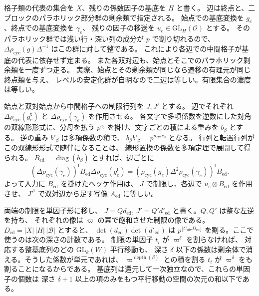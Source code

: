 格子類の代表の集合を \(X\)、残りの係数因子の基底を \(H\) と書く。
辺は終点と、二ブロックのパラホリック部分群の剰余類で指定される。
始点での基底変換を \(g_e\)、終点での基底変換を \(\gamma_e\)、
残りの因子の移送を \(u_e\in\mathrm{GL}_H(\mathcal O)\) とする。
そのパラホリック群では浅い行・深い列の成分が \(p\) で割り切れるので、
\(\Delta\rho_\mathrm{cyc}(g)\Delta^{-1}\) はこの群に対して整である。
これにより各辺での中間格子が基底の代表に依存せず定まる。
また各双対辺も、始点とそこでのパラホリック剰余類を一度ずつ走る。
実際、始点とその剰余類が同じなら遷移の有理元が同じ終点類を与え、
レベルの安定化群が自明なので二辺は等しい。有限集合の濃度は等しい。

始点と双対始点から中間格子への制限行列を \(J,J'\) とする。
辺でそれぞれ \(\Delta\rho_\mathrm{cyc}(g_e^{\mathsf t})\) と
\(\Delta\rho_\mathrm{cyc}(\gamma_e)\) を作用させる。
各文字で多項係数を逆数にした対角の双線形形式に、分母を払う
\(p^{c_0}\) を掛け、文字ごとの積による重みを \(b_\beta\) とする。
逆の重み \(b'_\beta\) は多項係数の積で、
\(b_\beta b'_\beta=p^{n_\mathrm{cyc}c_0}\) となる。
行列と転置行列がこの双線形形式で随伴になることは、
線形置換の係数を多項定理で展開して得られる。
\(B_\mathrm{ed}=\operatorname{diag}(b_\beta)\) とすれば、辺ごとに
\[
 (\Delta\rho_\mathrm{cyc}(\gamma_e))^{\mathsf t}B_\mathrm{ed}
       \Delta\rho_\mathrm{cyc}(g_e^{\mathsf t})
   =(\rho_\mathrm{cyc}(g_e)\Delta^2\rho_\mathrm{cyc}(\gamma_e))^{\mathsf t}B_\mathrm{ed}.
\]
よって入力に \(B_\mathrm{ed}\) を掛けたヘッケ作用は、
\(J\) で制限し、各辺で \(u_e\otimes B_\mathrm{ed}\) を作用させ、
\(J'^{\mathsf t}\) で双対辺から足す写像 \(A_\mathrm{ed}\) に等しい。

両端の制限を単因子形に移し、
\(J=Qd_\mathrm{ed}\), \(J'=Q'd'_\mathrm{ed}\) と書く。\(Q,Q'\) は整な左逆を持ち、
それぞれの像は \(\varpi\) の冪で飽和させた制限の像である。
\(D_\mathrm{ed}=|X|\,|H|\,|\mathcal B|\) とすると、
\(\det(d_\mathrm{ed})\det(d'_\mathrm{ed})\) は \(p^{\lfloor C_{\mathrm{div}}D_\mathrm{ed}\rfloor}\)
を割る。ここで使うのは次の深さの計数である。
制限の単因子 \(t_i\) が \(\varpi^\delta\) を割らなければ、
対応する整基底列のどの \(\mathrm{GL}_k(W)\) 平行移動も、
深さ \(\delta\) 以下の係数は剰余体で消える。そうした係数が単元であれば、
\(\varpi^{\operatorname{depth}(\beta)}\) との積を割る \(t_i\) が
\(\varpi^\delta\) をも割ることになるからである。
基底列は還元して一次独立なので、これらの単因子の個数は
深さ \(\delta+1\) 以上の項のみをもつ平行移動の空間の次元の和以下である。

